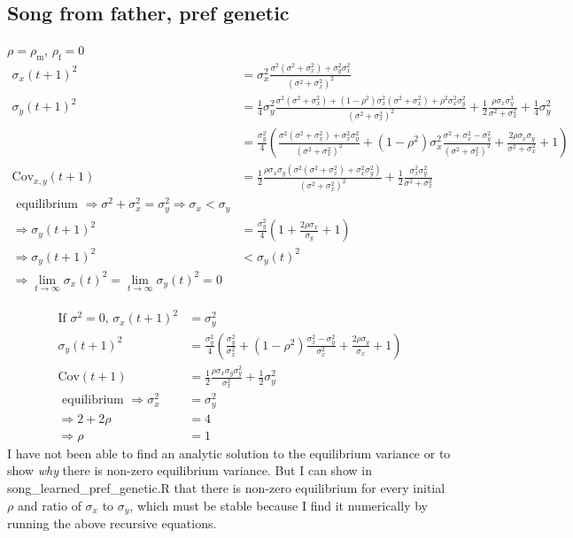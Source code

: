 \documentclass{article}
\newcommand{\x}[1]{\text{#1}}
\newcommand{\Cov}{\text{Cov}}
\begin{document}
\subsection{Song from father, pref genetic }
$\rho = \rho_\x{m}$, $\rho_\x{f}=0$
\begin{align*}
\sigma_{x}(t+1)^2&=\sigma_{x}^2\frac{\sigma^2(\sigma^2+\sigma_{x}^2)+\sigma_y^2\sigma_x^2}{(\sigma^2+\sigma_x^2)^2}
\\ \sigma_y(t+1)^2&=\frac{1}{4}\sigma_y^2\frac{\sigma^2(\sigma^2+\sigma_x^2)+(1-\rho^2)\sigma_x^2(\sigma^2+\sigma_x^2)+\rho^2\sigma_x^2\sigma_y^2}{(\sigma^2+\sigma_x^2)^2}+\frac{1}{2}\frac{\rho\sigma_x\sigma_y^3}{\sigma^2+\sigma_x^2}+\frac{1}{4}\sigma_y^2 
\\ &=\frac{\sigma_y^2}{4}\left(\frac{\sigma^2(\sigma^2+\sigma_x^2)+\sigma_x^2\sigma_y^2}{(\sigma^2+\sigma_x^2)^2}+(1-\rho^2)\sigma_x^2\frac{\sigma^2+\sigma_x^2-\sigma_y^2}{(\sigma^2+\sigma_x^2)^2}+\frac{2\rho\sigma_x\sigma_y}{\sigma^2+\sigma_x^2}+1\right)
\\ \Cov_{x,y}(t+1)&=\frac{1}{2}\frac{\rho\sigma_x\sigma_y\left(\sigma^2(\sigma^2+\sigma_x^2)+\sigma_x^2\sigma_y^2\right)}{(\sigma^2+\sigma_x^2)^2}+\frac{1}{2}\frac{\sigma_x^2\sigma_y^2}{\sigma^2+\sigma_x^2}
\\\text{ equilibrium } \Rightarrow \sigma^2+\sigma_x^2=\sigma_y^2 \Rightarrow \sigma_x<\sigma_y
\\ \Rightarrow \sigma_y(t+1)^2&=\frac{\sigma_y^2}{4}\left(1+\frac{2\rho\sigma_x}{\sigma_y}+1\right)
\\ \Rightarrow \sigma_y(t+1)^2&<\sigma_y(t)^2
\\ \Rightarrow \lim_{t\to\infty}\sigma_x(t)^2=\lim_{t\to\infty}\sigma_y(t)^2=0
\end{align*}

\begin{align*}
\text{If $\sigma^2=0$, } \sigma_x(t+1)^2&=\sigma_y^2
\\ \sigma_y(t+1)^2&=\frac{\sigma_y^2}{4}\left(\frac{\sigma_y^2}{\sigma_x^2}+(1-\rho^2)\frac{\sigma_x^2-\sigma_y^2}{\sigma_x^2}+\frac{2\rho\sigma_y}{\sigma_x}+1\right)
\\\Cov(t+1)&=\frac{1}{2}\frac{\rho\sigma_x\sigma_y\sigma_y^2}{\sigma_x^2}+\frac{1}{2}\sigma_y^2
\\ \text{ equilibrium } \Rightarrow \sigma_x^2&=\sigma_y^2
\\ \Rightarrow 2+2\rho&=4
\\ \Rightarrow \rho&=1
\end{align*}
I have not been able to find an analytic solution to the equilibrium variance or to show \emph{why} there is non-zero equilibrium variance. But I can show in song\_learned\_pref\_genetic.R that there is non-zero equilibrium for every initial $\rho$ and ratio of $\sigma_{x}$ to $\sigma_y$, which must be stable because I find it numerically by running the above recursive equations.
\end{document}
